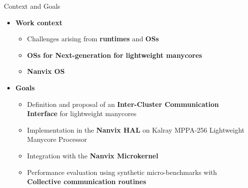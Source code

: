 	\begin{frame}[fragile]{Context and Goals}
		\begin{itemize}
			\item \textbf{Work context}
			\begin{itemize}
				\item Challenges arising from \textbf{runtimes} and \textbf{OSs}
				\item \textbf{OSs for Next-generation for lightweight manycores}
				\item \textbf{Nanvix OS}
			\end{itemize}
		\end{itemize}

		\begin{itemize}
			\item \textbf{Goals}
			\begin{itemize}
				\item Definition and proposal of an \textbf{Inter-Cluster Communication Interface} for lightweight manycores
				\item Implementation in the \textbf{Nanvix HAL} on Kalray MPPA-256 Lightweight Manycore Processor
				\item Integration with the \textbf{Nanvix Microkernel}
				\item Performance evaluation using synthetic micro-benchmarks with \textbf{Collective communication routines}
			\end{itemize}
		\end{itemize}

	\end{frame}

		


